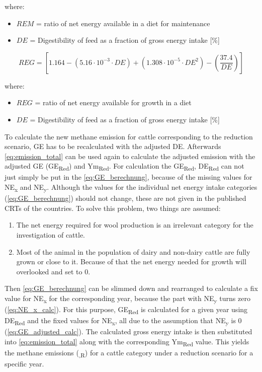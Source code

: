 \noindent where:
\begin{itemize}
	\item $REM$ = ratio of net energy available in a diet for maintenance
	\item $DE$ = Digestibility of feed as a fraction of gross energy intake [\%] 
\end{itemize}

\begin{equation}
	REG = \left[1.164 - (5.16 \cdot 10^{-3} \cdot DE) + (1.308\cdot 10^{-5} \cdot DE^{2}) - \left( \frac{37.4}{DE}\right) \right]
	\label{eq:REG_calculation}
\end{equation}

\noindent where:
\begin{itemize}
	\item $REG$ = ratio of net energy available for growth in a diet
	\item $DE$ = Digestibility of feed as a fraction of gross energy intake [\%] 
\end{itemize}

\noindent To calculate the new methane emission for cattle corresponding to the reduction scenario, GE has to be recalculated with the adjusted DE. Afterwards \cref{eq:emission_total} can be used again to calculate the adjusted  emission with the adjusted GE (GE\textsubscript{Red}) and Ym\textsubscript{Red}. 
For calculation the GE\textsubscript{Red}, DE\textsubscript{Red} can not just simply be put in the \cref{eq:GE_berechnung}, because of the missing values for NE\textsubscript{x} and NE\textsubscript{y}. Although the values for the individual net energy intake categories (\cref{eq:GE_berechnung}) should not change, these are not given in the published CRTs of the countries. 
To solve this problem, two things are assumed:
\begin{enumerate}
	\item The net energy required for wool production is an irrelevant category for the investigation of cattle.
	\item Most of the animal in the population of dairy and non-dairy cattle are fully grown or close to it. Because of that the net energy needed for growth will overlooked and set to 0. 
\end{enumerate}

\noindent Then \cref{eq:GE_berechnung} can be slimmed down and rearranged to calculate a fix value for NE\textsubscript{x} for the corresponding year, because the part with NE\textsubscript{y} turns zero (\cref{eq:NE_x_calc}). For this purpose, GE\textsubscript{Red} is calculated for a given year using DE\textsubscript{Red} and the fixed values for NE\textsubscript{x}, all due to the assumption that NE\textsubscript{y} is 0 (\cref{eq:GE_adjusted_calc}). The calculated gross energy intake is then substituted into \cref{eq:emission_total} along with the corresponding Ym\textsubscript{Red} value. This yields the methane emissions (\textsubscript{,R}) for a cattle category under a reduction scenario for a specific year.


